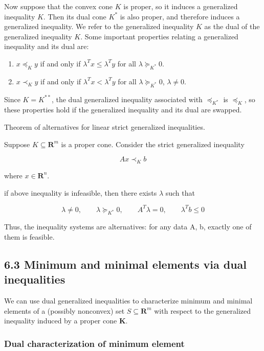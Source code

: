 \documentclass{article}
\begin{document}
Now suppose that the convex cone $K$ is proper, so it induces a generalized inequality
$K$. Then its dual cone $K^*$ is also proper, and therefore induces a generalized
inequality. We refer to the generalized inequality $K$ as the dual of the generalized
inequality $K$.
Some important properties relating a generalized inequality and its dual are:
\begin{enumerate}
    \item $x \preceq_K y$ if and only if $\lambda^T x \le \lambda^T y$ for all $\lambda \succeq_{K^*} 0$.
    \item $x \prec_K y$ if and only if $\lambda^T x < \lambda^T y$ for all $\lambda \succeq_{K^*} 0$, $\lambda\ne 0$. 
\end{enumerate}

Since $K = K^{**}$, the dual generalized inequality associated with $\preceq_{K^*}$ is $\preceq_K$, so
these properties hold if the generalized inequality and its dual are swapped.

\vspace*{0.3cm}

Theorem of alternatives for linear strict generalized inequalities.

Suppose $K \subseteq \mathbf{R}^m$ is a proper cone. Consider the strict generalized inequality

\[
Ax\prec_K b    
\]

where $x\in \mathbf{R}^n$.

if above inequality is infeasible, then there exists $\lambda$ such that

\[
    \lambda \ne 0,\qquad \lambda \succeq_{K^*} 0,\qquad A^T \lambda = 0,\qquad \lambda^T b \le 0    
\]

Thus, the inequality systems are alternatives: for any data A, b,
exactly one of them is feasible.

\subsection*{6.3 Minimum and minimal elements via dual inequalities}

We can use dual generalized inequalities to characterize minimum and minimal
elements of a (possibly nonconvex) set $S \subseteq \mathbf{R}^m$ with respect to the generalized
inequality induced by a proper cone \textbf{K}.

\subsubsection*{Dual characterization of minimum element}
\end{document}
